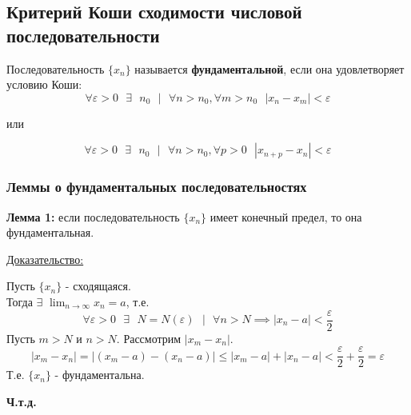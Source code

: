 \documentclass[12pt]{article}
\def\posl#1#2{\{#1_{#2}\}}
\begin{document}
    \subsection{Критерий Коши сходимости числовой последовательности}
    \noindent Последовательность $\{x_n\}$ называется \textbf{фундаментальной}, если она удовлетворяет условию Коши:
    \[ \forall \varepsilon > 0 \text{ } \exists \text{ } n_{0} \text{ } \big| \text{ } \forall n > n_{0}, \forall m > n_{0} \text{ } |x_n - x_{m}| < \varepsilon \]
    \begin{center}
        или
    \end{center}
    \[ \forall \varepsilon > 0 \text{ } \exists \text{ } n_{0} \text{ } \big| \text{ } \forall n > n_{0}, \forall p > 0 \text{ } |x_{n+p} - x_n| < \varepsilon \]
    \subsubsection*{Леммы о фундаментальных последовательностях}
    \noindent \textbf{Лемма 1:} если последовательность $\{x_n\}$ имеет конечный предел, то она фундаментальная.\par\noindent
    \underline{Доказательство:}
    \begin{adjustwidth}{1.5em}{1.5em}
        Пусть $\posl{x}{n}$ - сходящаяся.\\
        Тогда $\exists$ $\lim_{n\to\infty}x_n = a$, т.е.
        \[ \forall \varepsilon > 0 \text{ } \exists \text{ } N = N(\varepsilon) \text{ } \big| \text{ } \forall n > N \implies |x_{n} - a| < \frac{\varepsilon}{2} \]
        Пусть $m > N$ и $n > N$. Рассмотрим $|x_m - x_n|$.
        \[
            |x_m - x_n| = |(x_m - a) - (x_n - a)| \le |x_m - a| + |x_n - a| < \frac{\varepsilon}{2} + \frac{\varepsilon}{2} = \varepsilon
        \]
        Т.е. $\posl{x}{n}$ - фундаментальна.
        \begin{center}
            \textbf{Ч.т.д.}
        \end{center}
    \end{adjustwidth}
\end{document}
